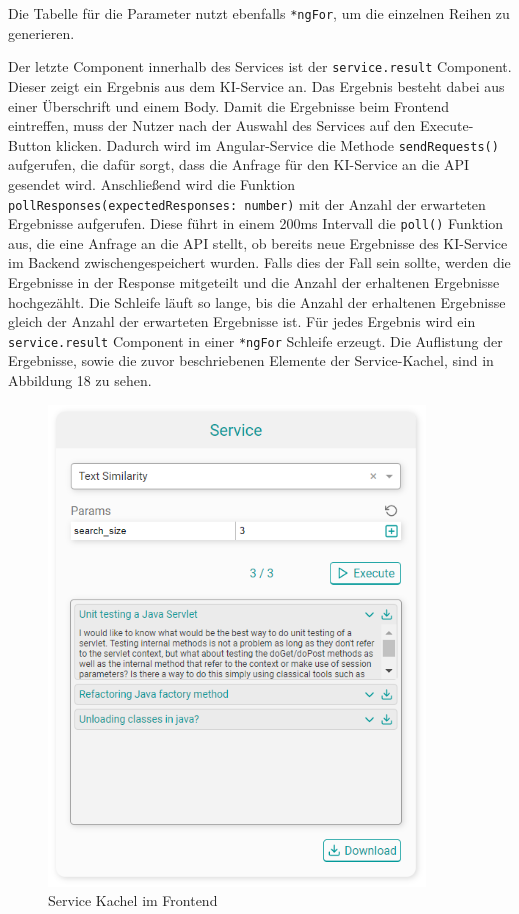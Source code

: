 Die Tabelle für die Parameter nutzt ebenfalls \texttt{*ngFor}, um die einzelnen Reihen zu generieren. 

Der letzte Component innerhalb des Services ist der \texttt{service.result} Component. Dieser zeigt ein Ergebnis aus dem KI-Service an. Das Ergebnis besteht dabei aus einer Überschrift und einem Body. Damit die Ergebnisse beim Frontend eintreffen, muss der Nutzer nach der Auswahl des Services auf den Execute-Button klicken. Dadurch wird im Angular-Service die Methode \texttt{sendRequests()} aufgerufen, die dafür sorgt, dass die Anfrage für den KI-Service an die API gesendet wird. Anschließend wird die Funktion \texttt{pollResponses(expectedResponses: number)} mit der Anzahl der erwarteten Ergebnisse aufgerufen. Diese führt in einem 200ms Intervall die \texttt{poll()} Funktion aus, die eine Anfrage an die API stellt, ob bereits neue Ergebnisse des KI-Service im Backend zwischengespeichert wurden. Falls dies der Fall sein sollte, werden die Ergebnisse in der Response mitgeteilt und die Anzahl der erhaltenen Ergebnisse hochgezählt. Die Schleife läuft so lange, bis die Anzahl der erhaltenen Ergebnisse gleich der Anzahl der erwarteten Ergebnisse ist. Für jedes Ergebnis wird ein \texttt{service.result} Component in einer \texttt{*ngFor} Schleife erzeugt. Die Auflistung der Ergebnisse, sowie die zuvor beschriebenen Elemente der Service-Kachel, sind in Abbildung 18 zu sehen. 

\begin{figure}[H]
  \centering
    \includegraphics[width = 10cm]{bilder/websiteService}
    \caption{Service Kachel im Frontend}
\end{figure}

